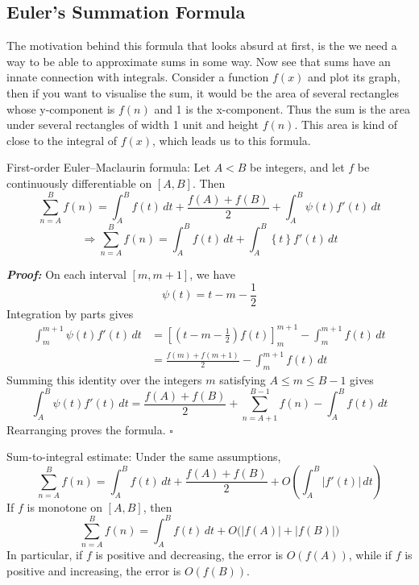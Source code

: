 \documentclass[a4paper,11pt,abstracton]{scrartcl}
\theoremstyle{dotlessP}
\theoremstyle{dotlessS}
\theoremstyle{remark}
\theoremstyle{definition}
\begin{document}
\subsection{Euler's Summation Formula}
\label{subsec:euler-summation}

The motivation behind this formula that looks absurd at first, is the we need a way to be able to approximate sums in some way. Now see that sums have an innate connection with integrals. Consider a function $f(x)$ and plot its graph, then if you want to visualise the sum, it would be the area of several rectangles whose y-component is $f(n)$ and 1 is the x-component. Thus the sum is the area under several rectangles of width 1 unit and height $f(n)$. This area is kind of close to the integral of $f(x)$, which leads us to this formula.

\begin{mainbox}{First-order Euler--Maclaurin formula:}
Let $A<B$ be integers, and let $f$ be continuously differentiable on
$[A,B]$. Then
\[
    \sum_{n=A}^{B}f(n)
      =\int_A^B f(t)\,dt
       +\frac{f(A)+f(B)}2
       +\int_A^B\psi(t)f'(t)\,dt
\]
$$\Rightarrow \sum_{n=A}^{B}f(n)
      =\int_A^B f(t)\,dt
       +\int_A^B\left\{t\right\}f'(t)\,dt$$
\end{mainbox}

\begin{claim_box}
\textbf{\textit{Proof:}}
On each interval $[m,m+1]$, we have
\[
    \psi(t)=t-m-\frac12
\]
Integration by parts gives
\begin{align*}
    \int_m^{m+1}\psi(t)f'(t)\,dt
      &=\left[\left(t-m-\frac12\right)f(t)\right]_m^{m+1}
        -\int_m^{m+1}f(t)\,dt\\
      &=\frac{f(m)+f(m+1)}2
        -\int_m^{m+1}f(t)\,dt
\end{align*}
Summing this identity over the integers $m$ satisfying
$A\leq m\leq B-1$ gives
\[
    \int_A^B\psi(t)f'(t)\,dt
      =\frac{f(A)+f(B)}2
       +\sum_{n=A+1}^{B-1}f(n)
       -\int_A^Bf(t)\,dt
\]
Rearranging proves the formula.
\hfill$\square$
\end{claim_box}

\begin{mainbox}{Sum-to-integral estimate:}
Under the same assumptions,
\[
    \sum_{n=A}^{B}f(n)
      =\int_A^B f(t)\,dt
       +\frac{f(A)+f(B)}2
       +O\!\left(\int_A^B|f'(t)|\,dt\right)
\]
If $f$ is monotone on $[A,B]$, then
\[
    \sum_{n=A}^{B}f(n)
      =\int_A^B f(t)\,dt
       +O\bigl(|f(A)|+|f(B)|\bigr)
\]
In particular, if $f$ is positive and decreasing, the error is
$O(f(A))$, while if $f$ is positive and increasing, the error is
$O(f(B))$.
\end{mainbox}
\end{document}
